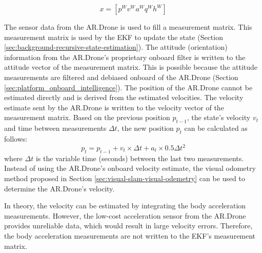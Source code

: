 \begin{equation}
x = [ p^{W}  v^{W}  a^{W}  q^{W} h^{W} ]
\label{eq:EKF_state_vecor}
\end{equation}

The sensor data from the AR.Drone is used to fill a measurement matrix.
This measurement matrix is used by the EKF to update the state (Section \ref{sec:background-recursive-state-estimation}).
The attitude (orientation) information from the AR.Drone's proprietary onboard filter is written to the attitude vector of the measurement matrix.
This is possible because the attitude measurements are filtered and debiased onboard of the AR.Drone (Section \ref{sec:platform_onboard_intelligence}).
The position of the AR.Drone cannot be estimated directly and is derived from the estimated velocities.
The velocity estimate sent by the AR.Drone is written to the velocity vector of the measurement matrix.
Based on the previous position $p_{t-1}$, the state's velocity $v_{t}$ and time between measurements $\Delta t$, the new position $p_{t}$ can be calculated as follows:
\begin{equation}
p_{t} = p_{t-1} + v_{t} \times \Delta t + a_{t} \times 0.5 \Delta t^2
\end{equation}
where $\Delta t$ is the variable time (seconds) between the last two measurements.
Instead of using the AR.Drone's onboard velocity estimate, the visual odometry method proposed in Section \ref{sec:visual-slam-visual-odemetry} can be used to determine the AR.Drone's velocity.

In theory, the velocity can be estimated by integrating the body acceleration measurements.
However, the low-cost acceleration sensor from the AR.Drone provides unreliable data, which would result in large velocity errors.
Therefore, the body acceleration measurements are not written to the EKF's measurement matrix.

